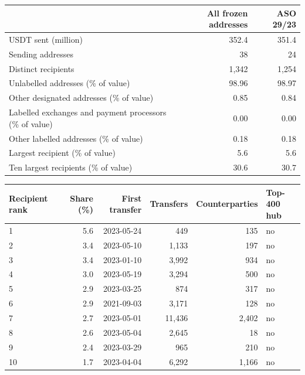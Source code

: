 \caption{\textbf{Where the USDT that left frozen designated addresses between signing and freeze went.} Outflows of the frozen designated addresses between the signing of their order and Tether's blacklisting, from complete histories, by category of recipient; the May 2023 order (ASO 29/23) is shown separately because it supplies almost all of the value. Recipients are categorised by third-party entity labels, which are sparse, so the labelled shares are lower bounds. The lower panel describes the ten largest recipients of the pooled outflow from their own complete histories: the date of their first USDT transfer, their lifetime transfer count, their distinct counterparties, and whether they are among the 400 most active addresses of the complete network (\texttt{scripts/compute\_post\_signing\_flows.py}).}
\label{tab:post-signing}
\begin{tabular}{lrr}
\toprule
 & \textbf{All frozen addresses} & \textbf{ASO 29/23} \\
\midrule
USDT sent (million) & 352.4 & 351.4 \\
Sending addresses & 38 & 24 \\
Distinct recipients & 1,342 & 1,254 \\
\midrule
Unlabelled addresses (\% of value) & 98.96 & 98.97 \\
Other designated addresses (\% of value) & 0.85 & 0.84 \\
Labelled exchanges and payment processors (\% of value) & 0.00 & 0.00 \\
Other labelled addresses (\% of value) & 0.18 & 0.18 \\
\midrule
Largest recipient (\% of value) & 5.6 & 5.6 \\
Ten largest recipients (\% of value) & 30.6 & 30.7 \\
\bottomrule
\end{tabular}

\medskip

\begin{tabular}{lrrrrl}
\toprule
\textbf{Recipient rank} & \textbf{Share (\%)} & \textbf{First transfer} & \textbf{Transfers} & \textbf{Counterparties} & \textbf{Top-400 hub} \\
\midrule
1 & 5.6 & 2023-05-24 & 449 & 135 & no \\
2 & 3.4 & 2023-05-10 & 1,133 & 197 & no \\
3 & 3.4 & 2023-01-10 & 3,992 & 934 & no \\
4 & 3.0 & 2023-05-19 & 3,294 & 500 & no \\
5 & 2.9 & 2023-03-25 & 874 & 317 & no \\
6 & 2.9 & 2021-09-03 & 3,171 & 128 & no \\
7 & 2.7 & 2023-05-01 & 11,436 & 2,402 & no \\
8 & 2.6 & 2023-05-04 & 2,645 & 18 & no \\
9 & 2.4 & 2023-03-29 & 965 & 210 & no \\
10 & 1.7 & 2023-04-04 & 6,292 & 1,166 & no \\
\bottomrule
\end{tabular}
